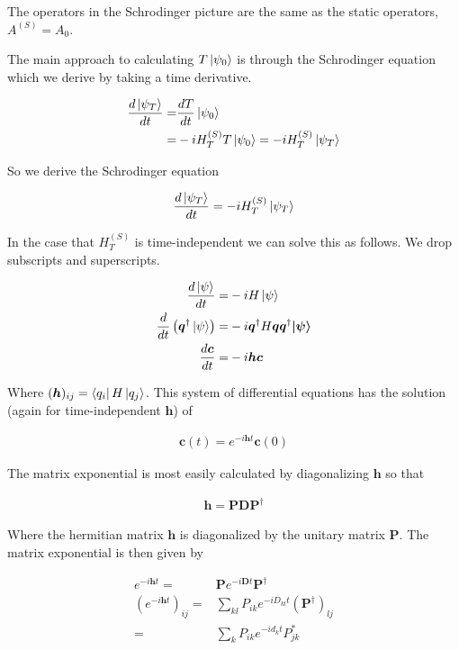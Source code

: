 \documentclass[12pt]{article}
\newcommand{\bv}[1]{\boldsymbol{#1}}
\begin{document}
The operators in the Schrodinger picture are the same as the static operators, $A^{(S)} = A_0$.

The main approach to calculating $T\ket{\psi_0}$ is through the Schrodinger equation which we derive by taking a time derivative.

\begin{align}
\frac{d \ket{\psi_T}}{dt} =& \frac{dT}{dt} \ket{\psi_0} \nonumber\\
=& -iH_T^{(S)}T\ket{\psi_0} = -iH_T^{(S)}\ket{\psi_T}
\end{align}

So we derive the Schrodinger equation

\begin{align}
\frac{d \ket{\psi_T}}{dt} = -iH_T^{(S)}\ket{\psi_T}
\end{align}

In the case that $H_T^{ (S)}$ is time-independent we can solve this as follows.
We drop subscripts and superscripts.

\begin{align}
\frac{d\ket{\psi}}{dt} =& -iH\ket{\psi} \nonumber\\
\frac{d}{dt}\left(\bv{q}^{\dag}\ket{\psi}\right) =& -i\bv{q}^{\dag}H\bv{q}\bv{q}^{\dag}\bv{\ket{\psi}} \nonumber\\
\frac{d\bv{c}}{dt} =& -i \bv{h} \bv{c}
\end{align}

Where $(\bv{h})_{ij} = \bra{q_i}H\ket{q_j}$.
This system of differential equations has the solution (again for time-independent $\bv{h}$) of

\begin{align}
\bv{c}(t) = e^{-i\bv{h}t}\bv{c}(0)
\end{align}

The matrix exponential is most easily calculated by diagonalizing $\bv{h}$ so that

\begin{align}
\bv{h} = \bv{P} \bv{D} \bv{P}^{\dag}
\end{align}

Where the hermitian matrix $\bv{h}$ is diagonalized by the unitary matrix $\bv{P}$.
The matrix exponential is then given by

\begin{align}
e^{-i\bv{h}t} =& \bv{P}e^{-i\bv{D}t}\bv{P}^{\dag} \nonumber\\
\left(e^{-i\bv{h}t}\right)_{ij} =& \sum_{kl}P_{ik}e^{-iD_{kl} t}\left(\bv{P}^{\dag}\right)_{lj} \nonumber\\
=& \sum_k P_{ik} e^{-id_k t} P_{jk}^*
\end{align}
\end{document}
